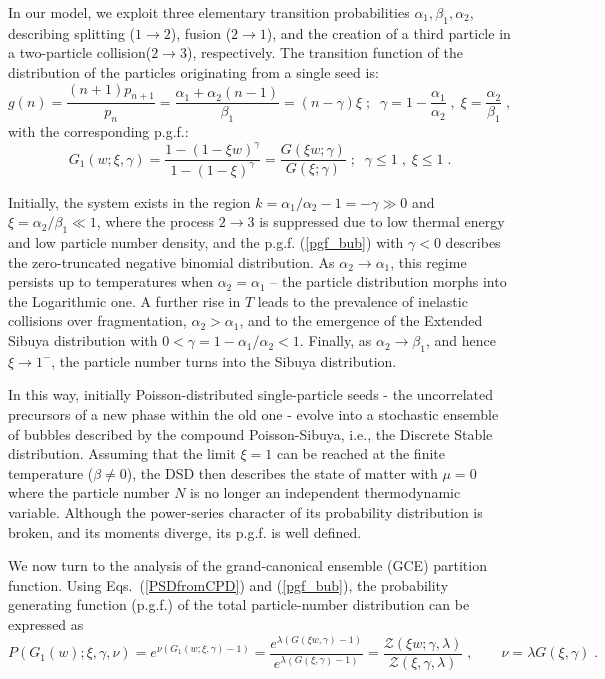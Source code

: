 \documentclass[a4paper,12pt]{amsart}
\theoremstyle{definition}
\theoremstyle{remark}
\begin{document}
In our model, we exploit three elementary transition probabilities $\alpha_1, \beta_1, \alpha_2$, describing splitting ($1\to2$), fusion ($2\to1$), and the creation of a third particle in a two-particle collision($2\to3$), respectively. The transition function of the distribution of the particles originating from a single seed is:
\begin{equation}\label{gn_bub}
g(n)=\frac{(n+1)p_{n+1}}{p_n}=\frac{\alpha_1+\alpha_2(n-1)}{\beta_1}=(n-\gamma)\xi \;;\;\; \gamma=1-\frac{\alpha_1}{\alpha_2}\;,\;
\xi=\frac{\alpha_2}{\beta_1}\;,
\end{equation}
with the corresponding p.g.f.: 
\begin{equation}\label{pgf_bub}
G_1(w;\xi,\gamma)=\frac{1-(1-\xi w)^{\gamma}}{1-(1-\xi)^{\gamma}}= \frac{G(\xi w;\gamma)}{G(\xi;\gamma)}\;;\;\; 
\gamma\leq 1\;,\; \xi\leq 1\;.
\end{equation}

Initially, the system exists in the region $k = \alpha_1/\alpha_2 - 1 = -\gamma\gg 0$ and $\xi= \alpha_2/\beta_1\ll1$, where the process $2\to3$ is suppressed due to low thermal energy and low particle number density, and the p.g.f. (\ref{pgf_bub}) with $\gamma<0$ describes the zero-truncated negative binomial distribution. As $\alpha_2\to \alpha_1$, this regime persists up to temperatures when  $\alpha_2 = \alpha_1$ -- the particle distribution morphs into the Logarithmic one. A further rise in $T$ leads to the prevalence of inelastic collisions over fragmentation,  $\alpha_2>\alpha_1$, and to the emergence of the Extended Sibuya distribution with $0<\gamma=1-\alpha_1/\alpha_2<1$. Finally, as $\alpha_2\to \beta_1$, and hence $\xi\to 1^{-}$, the particle number turns into the Sibuya distribution. 
 
 In this way, initially Poisson-distributed single-particle seeds - the uncorrelated precursors of a new phase within the old one - evolve into a stochastic ensemble of bubbles described by the compound Poisson-Sibuya, i.e., the Discrete Stable distribution. Assuming that the limit $\xi=1$ can be reached at the finite temperature ($\beta\neq 0$), the DSD then describes the state of matter with $\mu=0$ where the particle number $N$ is no longer an independent thermodynamic variable. Although the power-series character of its probability distribution is broken, and its moments diverge, its p.g.f. is well defined. 

 We now turn to the analysis of the grand-canonical ensemble (GCE) partition function. Using Eqs.~(\ref{PSDfromCPD}) and (\ref{pgf_bub}), the probability generating function (p.g.f.) of the total particle-number distribution can be expressed as
\begin{equation}\label{ZZ}
P(G_1(w);\xi, \gamma, \nu)=
 e^{\nu \left( G_1(w;\xi,\gamma)-1\right)}=
 \frac{e^{\lambda \left(G(\xi w,\gamma)-1\right)}}{e^{\lambda \left(G(\xi,\gamma)-1\right)}}=
 \frac{\mathcal{Z}(\xi w; \gamma, \lambda)}{\mathcal{Z}(\xi, \gamma, \lambda)}\;,\qquad \nu=\lambda G(\xi,\gamma)\;.    
\end{equation}
 
\end{document}
